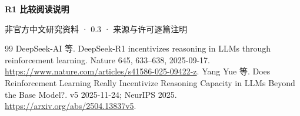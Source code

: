 \mainmatter
\begin{center}{\color{structurecolor}\bfseries\fontsize{18}{24}\selectfont R1 比较阅读说明}\par
非官方中文研究资料 · 0.3 · 来源与许可逐篇注明\end{center}
\originalcontents
\clearpage

\begin{thebibliography}{99}
 DeepSeek-AI 等. DeepSeek-R1 incentivizes reasoning in LLMs through reinforcement learning. Nature 645, 633–638, 2025-09-17. \url{https://www.nature.com/articles/s41586-025-09422-z}.
 Yang Yue 等. Does Reinforcement Learning Really Incentivize Reasoning Capacity in LLMs Beyond the Base Model?. v5 2025-11-24; NeurIPS 2025. \url{https://arxiv.org/abs/2504.13837v5}.
\end{thebibliography}

